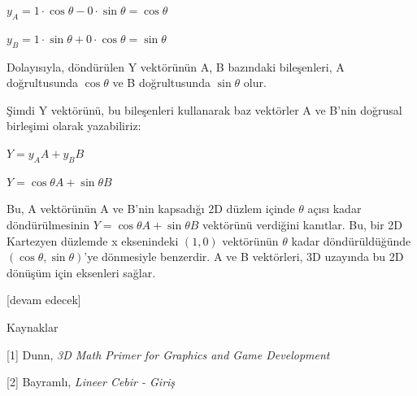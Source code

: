 \documentclass[12pt,fleqn]{article}\usepackage{../../common}
\begin{document}
$y_A = 1 \cdot \cos \theta - 0 \cdot \sin \theta = \cos \theta$

$y_B = 1 \cdot \sin \theta + 0 \cdot \cos \theta = \sin \theta$

Dolayısıyla, döndürülen Y vektörünün {A, B} bazındaki bileşenleri, A
doğrultusunda $\cos \theta$ ve B doğrultusunda $\sin \theta$ olur.

Şimdi Y vektörünü, bu bileşenleri kullanarak baz vektörler A ve B'nin
doğrusal birleşimi olarak yazabiliriz:

$Y = y_A A + y_B B$

$Y = \cos \theta A + \sin \theta B$

Bu, A vektörünün A ve B'nin kapsadığı 2D düzlem içinde $\theta$ açısı
kadar döndürülmesinin $Y = \cos \theta A + \sin \theta B$ vektörünü
verdiğini kanıtlar. Bu, bir 2D Kartezyen düzlemde x eksenindeki $(1,
0)$ vektörünün $\theta$ kadar döndürüldüğünde $(\cos \theta, \sin
\theta)$'ye dönmesiyle benzerdir. A ve B vektörleri, 3D uzayında bu 2D
dönüşüm için eksenleri sağlar.

[devam edecek]

Kaynaklar

[1] Dunn, {\em 3D Math Primer for Graphics and Game Development}

[2] Bayramlı, {\em Lineer Cebir - Giriş}
\end{document}
